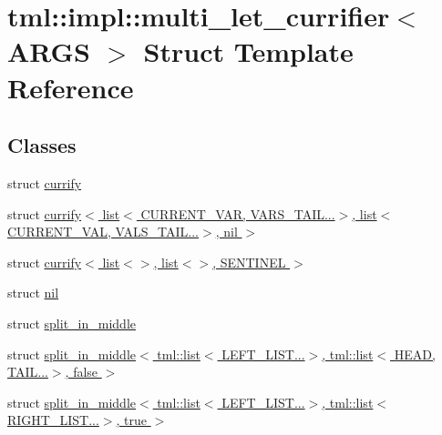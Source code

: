 \hypertarget{structtml_1_1impl_1_1multi__let__currifier}{\section{tml\+:\+:impl\+:\+:multi\+\_\+let\+\_\+currifier$<$ A\+R\+G\+S $>$ Struct Template Reference}
\label{structtml_1_1impl_1_1multi__let__currifier}
}
\subsection*{Classes}
\begin{DoxyCompactItemize}
\item 
struct \hyperlink{structtml_1_1impl_1_1multi__let__currifier_1_1currify}{currify}
\item 
struct \hyperlink{structtml_1_1impl_1_1multi__let__currifier_1_1currify_3_01list_3_01CURRENT__VAR_00_01VARS__TAIL_0ea6fde6f25a35f6c4f514840e32dfa6}{currify$<$ list$<$ C\+U\+R\+R\+E\+N\+T\+\_\+\+V\+A\+R, V\+A\+R\+S\+\_\+\+T\+A\+I\+L...$>$, list$<$ C\+U\+R\+R\+E\+N\+T\+\_\+\+V\+A\+L, V\+A\+L\+S\+\_\+\+T\+A\+I\+L...$>$, nil $>$}
\item 
struct \hyperlink{structtml_1_1impl_1_1multi__let__currifier_1_1currify_3_01list_3_4_00_01list_3_4_00_01SENTINEL_01_4}{currify$<$ list$<$$>$, list$<$$>$, S\+E\+N\+T\+I\+N\+E\+L $>$}
\item 
struct \hyperlink{structtml_1_1impl_1_1multi__let__currifier_1_1nil}{nil}
\item 
struct \hyperlink{structtml_1_1impl_1_1multi__let__currifier_1_1split__in__middle}{split\+\_\+in\+\_\+middle}
\item 
struct \hyperlink{structtml_1_1impl_1_1multi__let__currifier_1_1split__in__middle_3_01tml_1_1list_3_01LEFT__LIST_843785e5577dc8253b5980b3ba33c2080}{split\+\_\+in\+\_\+middle$<$ tml\+::list$<$ L\+E\+F\+T\+\_\+\+L\+I\+S\+T...$>$, tml\+::list$<$ H\+E\+A\+D, T\+A\+I\+L...$>$, false $>$}
\item 
struct \hyperlink{structtml_1_1impl_1_1multi__let__currifier_1_1split__in__middle_3_01tml_1_1list_3_01LEFT__LIST_84d079acf935021ec0ffe69943a037410}{split\+\_\+in\+\_\+middle$<$ tml\+::list$<$ L\+E\+F\+T\+\_\+\+L\+I\+S\+T...$>$, tml\+::list$<$ R\+I\+G\+H\+T\+\_\+\+L\+I\+S\+T...$>$, true $>$}
\end{DoxyCompactItemize}
